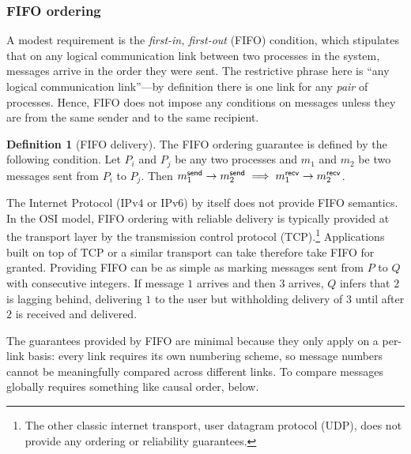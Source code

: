 \documentclass[]             %
{NASA}                       %
\theoremstyle{definition}
\newtheorem{definition}[theorem]{Definition}
\begin{document}
\subsubsection{FIFO ordering}
A modest requirement is the \emph{first-in, first-out} (FIFO)
condition, which stipulates that on any logical communication link
between two processes in the system, messages arrive in the order they
were sent. The restrictive phrase here is ``any logical communication
link''---by definition there is one link for any \emph{pair} of
processes. Hence, FIFO does not impose any conditions on messages
unless they are from the same sender and to the same recipient.

\begin{definition}[FIFO delivery]
  \label{def:fifo}
  The FIFO ordering guarantee is defined by the following condition. Let
  $P_i$ and $P_j$ be any two processes and $m_1$ and $m_2$ be two
  messages sent from $P_i$ to $P_j$. Then
  $m_{1}^{\mathsf{send}} \to m_{2}^{\mathsf{send}} \implies m_{1}^{\mathsf{recv}} \to m_{2}^{\mathsf{recv}}$.
\end{definition}

The Internet Protocol (IPv4 or IPv6) by itself does not provide FIFO
semantics. In the OSI model, FIFO ordering with reliable delivery is
typically provided at the transport layer by the transmission control
protocol (TCP).\footnote{The other classic internet transport, user
  datagram protocol (UDP), does not provide any ordering or
  reliability guarantees.} Applications built on top of TCP or a
similar transport can take therefore take FIFO for granted. Providing
FIFO can be as simple as marking messages sent from $P$ to $Q$ with
consecutive integers. If message $1$ arrives and then $3$ arrives, $Q$
infers that $2$ is lagging behind, delivering $1$ to the user but
withholding delivery of $3$ until after $2$ is received and delivered.

The guarantees provided by FIFO are minimal because they only apply on
a per-link basis: every link requires its own numbering scheme, so
message numbers cannot be meaningfully compared across different
links. To compare messages globally requires something like causal
order, below.
\end{document}
